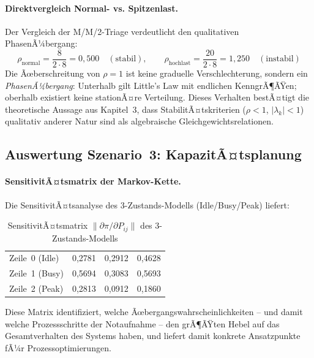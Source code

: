 ﻿\documentclass[a4paper,12pt]{report}
\theoremstyle{definition}
\begin{document}
\paragraph{Direktvergleich Normal- vs. Spitzenlast.}
Der Vergleich der M/M/2-Triage verdeutlicht den qualitativen PhasenÃ¼bergang:
\begin{equation}
	\rho_\text{normal} = \frac{8}{2 \cdot 8} = 0{,}500 \quad (\text{stabil}),
	\qquad
	\rho_\text{hochlast} = \frac{20}{2 \cdot 8} = 1{,}250 \quad (\text{instabil})
\end{equation}
Die Ãœberschreitung von $\rho = 1$ ist keine graduelle Verschlechterung,
sondern ein \emph{PhasenÃ¼bergang}: Unterhalb gilt Little's Law
mit endlichen KenngrÃ¶ÃŸen; oberhalb existiert keine stationÃ¤re Verteilung.
Dieses Verhalten bestÃ¤tigt die theoretische Aussage aus Kapitel~3, dass
StabilitÃ¤tskriterien ($\rho < 1$, $|\lambda_k| < 1$) qualitativ anderer
Natur sind als algebraische Gleichgewichtsrelationen.

\subsection{Auswertung Szenario~3: KapazitÃ¤tsplanung}

\paragraph{SensitivitÃ¤tsmatrix der Markov-Kette.}
Die SensitivitÃ¤tsanalyse des 3-Zustands-Modells (Idle/Busy/Peak) liefert:

\begin{table}[H]
	\centering
	\begin{tabular}{@{}lrrr@{}}
		\toprule
		& \boldmath{$\partial\pi / \partial P_{i,0}$} &
		\boldmath{$\partial\pi / \partial P_{i,1}$} &
		\boldmath{$\partial\pi / \partial P_{i,2}$} \\
		\midrule
		Zeile~0 (Idle) & 0{,}2781 & 0{,}2912 & 0{,}4628 \\
		Zeile~1 (Busy) & 0{,}5694 & 0{,}3083 & 0{,}5693 \\
		Zeile~2 (Peak) & 0{,}2813 & 0{,}0912 & 0{,}1860 \\
		\bottomrule
	\end{tabular}
	\caption{SensitivitÃ¤tsmatrix $\|\partial\pi/\partial P_{ij}\|$ des 3-Zustands-Modells}
	\label{tab:sensitivitaet}
\end{table}

Diese Matrix identifiziert, welche Ãœbergangswahrscheinlichkeiten -- und damit welche Prozessschritte der Notaufnahme -- den grÃ¶ÃŸten Hebel auf das Gesamtverhalten des Systems haben, und liefert damit konkrete Ansatzpunkte fÃ¼r Prozessoptimierungen.
\end{document}
